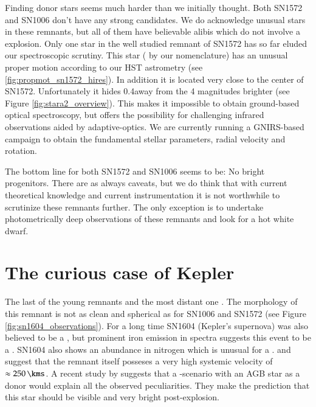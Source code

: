 Finding donor stars seems much harder than we initially thought. Both SN1572 and SN1006 don't have any strong candidates. We do acknowledge unusual stars in these remnants, but all of them have believable alibis which do not involve a \snia explosion. Only one star in the well studied remnant of SN1572 has so far eluded our spectroscopic scrutiny. This star ( by our nomenclature) has an unusual proper motion according to our HST astrometry (see \ref{fig:propmot_sn1572_hires}). In addition it is located very close to the \xray center of SN1572. Unfortunately it hides 0.4\arcsec away from the 4 magnitudes brighter \stara (see Figure \ref{fig:stara2_overview}). This makes it impossible to obtain ground-based optical spectroscopy, but offers the possibility for challenging infrared observations aided by adaptive-optics. We are currently running a GNIRS-based campaign to obtain the fundamental stellar parameters, radial velocity and rotation. 

The bottom line for both SN1572 and SN1006 seems to be: No bright progenitors. There are as always caveats, but we do think that with current theoretical knowledge and current instrumentation it is not worthwhile to scrutinize these remnants further. The only exception is to undertake photometrically deep observations of these remnants and look for a hot white dwarf. 

\section{The curious case of Kepler}

The last of the young remnants and the most distant one \citep[][estimates a distance of $\ge 6$\,\kpc]{2008ApJ...689..231V}.  The morphology of this remnant is not as clean and spherical as for SN1006 and SN1572 (see Figure \ref{fig:sn1604_observations}). For a long time SN1604 (Kepler's supernova) was also believed to be a \snib, but prominent iron emission in \xray spectra \citep{2007ApJ...668L.135R} suggests this event to be a \snia \citep{1995ApJ...444L..81H}. SN1604 also shows an abundance in nitrogen which is unusual for a \snia. \citet{1991ApJ...366..484B} and \citet{2003A&A...407..249S} suggest that the remnant itself posseses a very high systemic velocity of  $\approx 250\,\kms$. A recent study by \citet{2011arXiv1103.5487C} suggests that a \sd-scenario with an AGB star as a donor would explain all the observed peculiarities. They make the prediction that this star should be visible and very bright post-explosion. 

